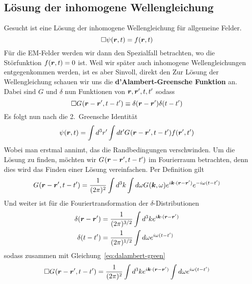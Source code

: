 \subsection{Lösung der inhomogene Wellengleichung}%
\label{sub:loesung-wellengleichung}
Gesucht ist eine Lösung der inhomogene Wellengleichung für allgemeine Felder.
\begin{equation}
  \Box \psi(\vb*r, t) = f(\vb*r, t)
\end{equation}
Für die EM-Felder werden wir dann den Spezialfall betrachten, wo die Störfunktion $f(\vb*r, t)=0$ ist. Weil wir später auch inhomogene Wellengleichungen entgegenkommen werden, ist es aber Sinvoll, direkt den
Zur Lösung der Wellengleichung schauen wir uns die \textbf{d'Alambert-Greensche Funktion} an. Dabei sind $G$ und $\delta$ nun Funktionen von $\vb*r, \vb*r', t, t'$ sodass
\begin{equation}
  \label{eq:dalambert-green}
  \Box G_{}(\vb*r-\vb*r',t-t') \equiv \delta(\vb*r-\vb*r')\delta(t-t')
\end{equation}
Es folgt nun nach die 2.\ Greensche Identität
\begin{equation}
  \label{eq:psi-green}
  \psi(\vb*r, t) = \int d^3r'\int dt' G_{}(\vb*r-\vb*r',t-t') f(\vb*r', t')
\end{equation}
Wobei man erstmal annimt, das die Randbedingungen verschwinden. Um die Lösung zu finden, möchten wir $G_{}(\vb*r-\vb*r',t-t')$ im Fourierraum betrachten, denn dies wird das Finden einer Lösung vereinfachen. Per Definition gilt
\begin{equation}
  \label{eq:fourier-dalembert-green}
  G_{}(\vb*r-\vb*r',t-t') = \frac{1}{(2\pi)^2} \int d^3k\int d\omega G_{}(\vb*k,\omega) e^{i\vb*k\cdot(\vb*r-\vb*r')}
  e^{-i\omega(t-t')}
\end{equation}
Und weiter ist für die Fouriertransformation der $\delta$-Distributionen
\begin{equation}
  \begin{split}
    \delta(\vb*r-\vb*r')
    &= 
    \frac{1}{(2\pi)^{3/2}} 
    \int d^3k e^{i\vb*k\cdot(\vb*r-\vb*r')}\\
    \delta(t-t')
    &= 
    \frac{1}{(2\pi)^{1/2}} 
    \int d\omega e^{i\omega(t-t')}\\
  \end{split}
\end{equation}
sodass zusammen mit Gleichung~\ref{eq:dalambert-green}
\begin{equation}
  \label{eq:fourier-dalembert-green2}
  \Box G_{}(\vb*r-\vb*r',t-t') =
    \frac{1}{(2\pi)^2} 
    \int d^3k e^{i\vb*k\cdot(\vb*r-\vb*r')}
    \int d\omega e^{i\omega(t-t')}
\end{equation}
